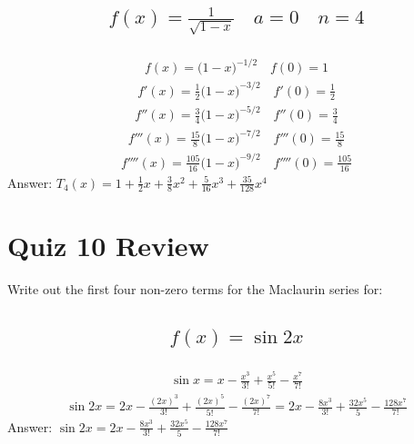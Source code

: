 \documentclass{article}
\begin{document}
\subsection{
	\begin{align*}
		f(x) = \frac{1}{\sqrt{1 - x}} \quad a = 0 \quad n = 4
	\end{align*}
}
\begin{align*}
	f(x) = \bigg( 1 - x \bigg)^{-1/2} \quad f(0) = 1
\end{align*}
\begin{align*}
	f'(x) = \frac{1}{2} \bigg( 1 - x \bigg)^{-3/2} \quad f'(0) = \frac{1}{2}
\end{align*}
\begin{align*}
	f''(x) = \frac{3}{4} \bigg( 1 - x \bigg)^{-5/2} \quad f''(0) = \frac{3}{4}
\end{align*}
\begin{align*}
	f'''(x) = \frac{15}{8} \bigg( 1 - x \bigg)^{-7/2} \quad f'''(0) = \frac{15}{8}
\end{align*}
\begin{align*}
	f''''(x) = \frac{105}{16} \bigg( 1 - x \bigg)^{-9/2} \quad f''''(0) = \frac{105}{16}
\end{align*}
Answer: $T_4 (x) = 1 + \frac{1}{2}x + \frac{3}{8} x^2 + \frac{5}{16} x^3 + \frac{35}{128} x^4$






\newpage
\section{Quiz 10 Review}
Write out the first four non-zero terms for the Maclaurin series for:
\subsection{
	\begin{align*}
		f(x) = \sin{2x}
	\end{align*}
}
\begin{align*}
	\sin{x} = x - \frac{x^3}{3!} + \frac{x^5}{5!} - \frac{x^7}{7!}
\end{align*}
\begin{align*}
	\sin{2x} = 2x - \frac{(2x)^3}{3!} + \frac{(2x)^5}{5!} - \frac{(2x)^7}{7!} = 2x - \frac{8x^3}{3!} + \frac{32x^5}{5} - \frac{128x^7}{7!}
\end{align*}
Answer: $\sin{2x} = 2x - \frac{8x^3}{3!} + \frac{32x^5}{5} - \frac{128x^7}{7!}$

\end{document}
